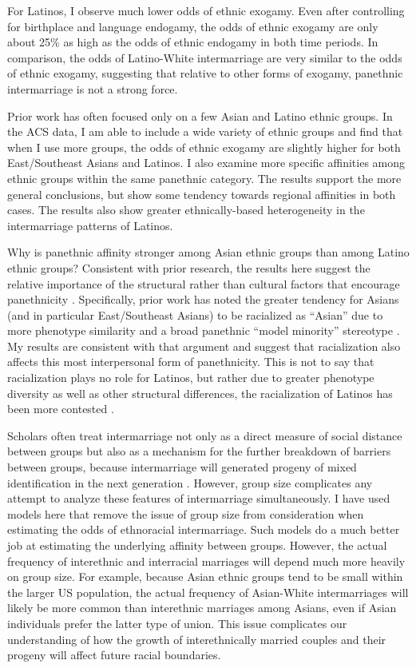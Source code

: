 \documentclass[11pt,]{article}
\begin{document}
For Latinos, I observe much lower odds of ethnic exogamy. Even after controlling for birthplace and language endogamy, the odds of ethnic exogamy are only about 25\% as high as the odds of ethnic endogamy in both time periods. In comparison, the odds of Latino-White intermarriage are very similar to the odds of ethnic exogamy, suggesting that relative to other forms of exogamy, panethnic intermarriage is not a strong force.

Prior work has often focused only on a few Asian and Latino ethnic groups. In the ACS data, I am able to include a wide variety of ethnic groups and find that when I use more groups, the odds of ethnic exogamy are slightly higher for both East/Southeast Asians and Latinos. I also examine more specific affinities among ethnic groups within the same panethnic category. The results support the more general conclusions, but show some tendency towards regional affinities in both cases. The results also show greater ethnically-based heterogeneity in the intermarriage patterns of Latinos.

Why is panethnic affinity stronger among Asian ethnic groups than among Latino ethnic groups? Consistent with prior research, the results here suggest the relative importance of the structural rather than cultural factors that encourage panethnicity \citep{lopez_panethnicity_1990}. Specifically, prior work has noted the greater tendency for Asians (and in particular East/Southeast Asians) to be racialized as ``Asian'' due to more phenotype similarity and a broad panethnic ``model minority'' stereotype \citep{lopez_panethnicity_1990, kibria_construction_1997, rosenfeld_salience_2001}. My results are consistent with that argument and suggest that racialization also affects this most interpersonal form of panethnicity. This is not to say that racialization plays no role for Latinos, but rather due to greater phenotype diversity as well as other structural differences, the racialization of Latinos has been more contested \citep{rodriguez_changing_2000a, frank_latino_2010a}.

Scholars often treat intermarriage not only as a direct measure of social distance between groups but also as a mechanism for the further breakdown of barriers between groups, because intermarriage will generated progeny of mixed identification in the next generation \citep{gordon_assimilation_1964}. However, group size complicates any attempt to analyze these features of intermarriage simultaneously. I have used models here that remove the issue of group size from consideration when estimating the odds of ethnoracial intermarriage. Such models do a much better job at estimating the underlying affinity between groups. However, the actual frequency of interethnic and interracial marriages will depend much more heavily on group size. For example, because Asian ethnic groups tend to be small within the larger US population, the actual frequency of Asian-White intermarriages will likely be more common than interethnic marriages among Asians, even if Asian individuals prefer the latter type of union. This issue complicates our understanding of how the growth of interethnically married couples and their progeny will affect future racial boundaries.
\end{document}
